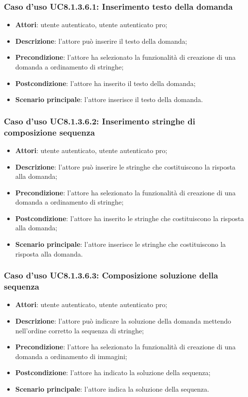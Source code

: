 \subsubsection{Caso d'uso UC8.1.3.6.1: Inserimento testo della domanda}
	\begin{itemize}
		\item \textbf{Attori}: utente autenticato, utente autenticato pro;
		\item \textbf{Descrizione}: l'attore può inserire il testo della domanda;
		\item\textbf{Precondizione}: l'attore ha selezionato la funzionalità di creazione di una domanda a ordinamento di stringhe;
		\item \textbf{Postcondizione}: l'attore ha inserito il testo della domanda;
		\item\textbf{Scenario principale}: l'attore inserisce il testo della domanda.
	\end{itemize}
	
\subsubsection{Caso d'uso UC8.1.3.6.2: Inserimento stringhe di composizione sequenza}
	\begin{itemize}
		\item \textbf{Attori}: utente autenticato, utente autenticato pro;
		\item \textbf{Descrizione}: l'attore può inserire le stringhe che costituiscono la risposta alla domanda;
		\item\textbf{Precondizione}: l'attore ha selezionato la funzionalità di creazione di una domanda a ordinamento di stringhe;
		\item \textbf{Postcondizione}: l'attore ha inserito le stringhe che costituiscono la risposta alla domanda;
		\item\textbf{Scenario principale}: l'attore inserisce le stringhe che costituiscono la risposta alla domanda.
	\end{itemize}
	
\subsubsection{Caso d'uso UC8.1.3.6.3: Composizione soluzione della sequenza}
	\begin{itemize}
		\item \textbf{Attori}: utente autenticato, utente autenticato pro;
		\item \textbf{Descrizione}: l'attore può indicare la soluzione della domanda mettendo nell'ordine corretto la sequenza di stringhe;
		\item\textbf{Precondizione}: l'attore ha selezionato la funzionalità di creazione di una domanda a ordinamento di immagini;
		\item \textbf{Postcondizione}: l'attore ha indicato la soluzione della sequenza;
		\item\textbf{Scenario principale}: l'attore indica la soluzione della sequenza. 
	\end{itemize}
